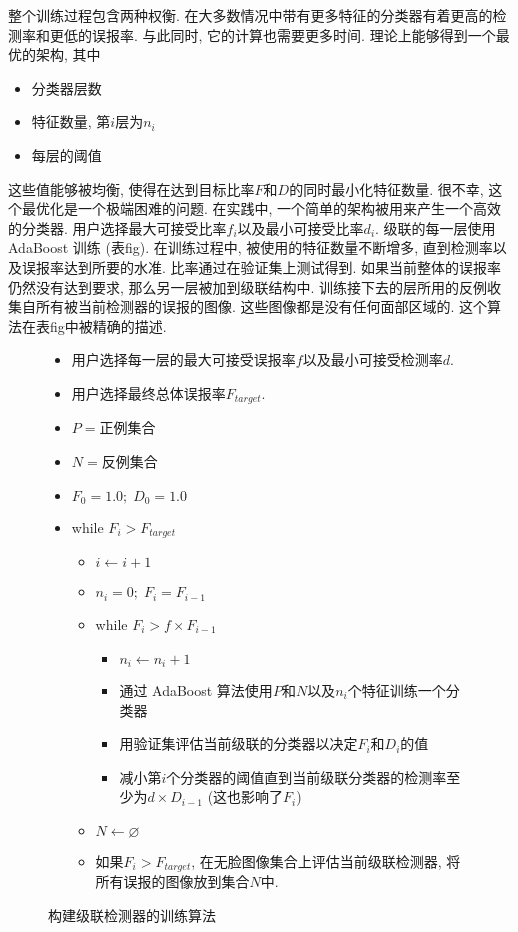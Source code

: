 \documentclass[utf8]{ctexart}
\begin{document}
整个训练过程包含两种权衡. 在大多数情况中带有更多特征的分类器有着更高的检测率和更低的误报率. 与此同时, 它的计算也需要更多时间. 理论上能够得到一个最优的架构, 其中
\begin{itemize}
\item 分类器层数
\item 特征数量, 第$i$层为$n_i$
\item 每层的阈值
\end{itemize}
这些值能够被均衡, 使得在达到目标比率$F$和$D$的同时最小化特征数量. 很不幸, 这个最优化是一个极端困难的问题.
在实践中, 一个简单的架构被用来产生一个高效的分类器. 用户选择最大可接受比率$f_i$以及最小可接受比率$d_i$. 级联的每一层使用 AdaBoost 训练 (表fig). 在训练过程中, 被使用的特征数量不断增多, 直到检测率以及误报率达到所要的水准. 比率通过在验证集上测试得到. 如果当前整体的误报率仍然没有达到要求, 那么另一层被加到级联结构中. 训练接下去的层所用的反例收集自所有被当前检测器的误报的图像. 这些图像都是没有任何面部区域的. 这个算法在表fig中被精确的描述.
\begin{figure}[!htb]
  \caption{构建级联检测器的训练算法}
  \begin{itemize}
  \item 用户选择每一层的最大可接受误报率$f$以及最小可接受检测率$d$.
  \item 用户选择最终总体误报率$F_{target}$.
  \item $P=$正例集合
  \item $N=$反例集合
  \item $F_0=1.0;\;D_0=1.0$
  \item while $F_i>F_{target}$
    \begin{itemize}
    \item $i\leftarrow i+1$
    \item $n_i=0;\;F_i=F_{i-1}$
    \item while $F_i>f\times F_{i-1}$
      \begin{itemize}
      \item $n_i\leftarrow n_i+1$
      \item 通过 AdaBoost 算法使用$P$和$N$以及$n_i$个特征训练一个分类器
      \item 用验证集评估当前级联的分类器以决定$F_i$和$D_i$的值
      \item 减小第$i$个分类器的阈值直到当前级联分类器的检测率至少为$d\times D_{i-1}$ (这也影响了$F_i$)
      \end{itemize}
    \item $N\leftarrow\varnothing$
    \item 如果$F_i>F_{target}$, 在无脸图像集合上评估当前级联检测器, 将所有误报的图像放到集合$N$中.
    \end{itemize}
\end{itemize}
\end{figure}
\end{document}
